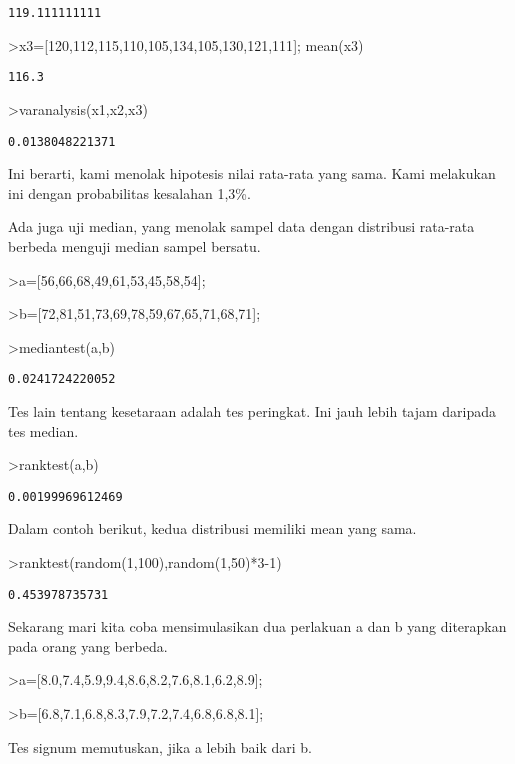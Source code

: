 \documentclass[
]{book}
\begin{document}
\begin{verbatim}
119.111111111
\end{verbatim}

\textgreater x3={[}120,112,115,110,105,134,105,130,121,111{]}; mean(x3)

\begin{verbatim}
116.3
\end{verbatim}

\textgreater varanalysis(x1,x2,x3)

\begin{verbatim}
0.0138048221371
\end{verbatim}

Ini berarti, kami menolak hipotesis nilai rata-rata yang sama. Kami melakukan ini dengan probabilitas kesalahan 1,3\%.

Ada juga uji median, yang menolak sampel data dengan distribusi rata-rata berbeda menguji median sampel bersatu.

\textgreater a={[}56,66,68,49,61,53,45,58,54{]};

\textgreater b={[}72,81,51,73,69,78,59,67,65,71,68,71{]};

\textgreater mediantest(a,b)

\begin{verbatim}
0.0241724220052
\end{verbatim}

Tes lain tentang kesetaraan adalah tes peringkat. Ini jauh lebih tajam daripada tes median.

\textgreater ranktest(a,b)

\begin{verbatim}
0.00199969612469
\end{verbatim}

Dalam contoh berikut, kedua distribusi memiliki mean yang sama.

\textgreater ranktest(random(1,100),random(1,50)*3-1)

\begin{verbatim}
0.453978735731
\end{verbatim}

Sekarang mari kita coba mensimulasikan dua perlakuan a dan b yang diterapkan pada orang yang berbeda.

\textgreater a={[}8.0,7.4,5.9,9.4,8.6,8.2,7.6,8.1,6.2,8.9{]};

\textgreater b={[}6.8,7.1,6.8,8.3,7.9,7.2,7.4,6.8,6.8,8.1{]};

Tes signum memutuskan, jika a lebih baik dari b.
\end{document}
